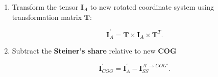 \documentclass[10pt,b5paper,titlepage]{book}
\begin{document}
\begin{itemize}
\begin{enumerate}
            \item Transform the tensor $\mathbf{I}_{A}$ to new rotated coordinate
                system using transformation matrix $\mathbf{T}$:

                \begin{equation}
                    \mathbf{I}_{A}^{'} = \mathbf{T} \times \mathbf{I}_{A} \times \mathbf{T}^{T}
                .\end{equation}

            \item Subtract the \textbf{Steiner's share} relative to new \textbf{COG}

                \begin{equation}
                    \mathbf{I}_{COG}^{'} = \mathbf{I}_{A}^{'} - \mathbf{I}_{SS}^{A' \to COG'}
                .\end{equation}

        \end{enumerate}



\end{itemize}
\end{document}
